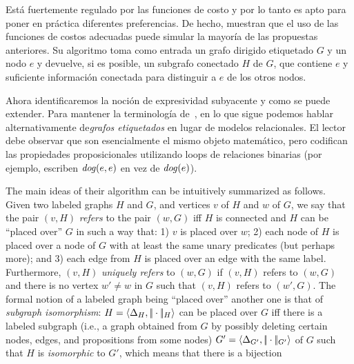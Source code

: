 Est\'a fuertemente regulado por las funciones de costo y por lo tanto es apto para poner en pr\'actica
diferentes preferencias. De hecho, muestran que el uso de las funciones de costos adecuadas
puede simular la mayor\'ia de las propuestas anteriores. Su algoritmo toma como entrada
un grafo dirigido etiquetado $G$ y un nodo $e$ y devuelve, si es posible,
un subgrafo conectado $H$  de $G$, que contiene $e$ y suficiente informaci\'on conectada para
distinguir a $e$ de los otros nodos.

Ahora identificaremos la noci\'on de expresividad subyacente y como se puede extender.
Para mantener la terminolog\'ia de~\cite{Krahmer2003}, en lo que sigue
podemos hablar alternativamente de\emph{grafos etiquetados} en lugar de modelos relacionales.
El lector debe observar que son esencialmente el mismo objeto matemático, pero codifican las propiedades proposicionales utilizando
loops de relaciones binarias (por ejemplo, escriben $\mathit{dog}(e,e)$ en vez de $\mathit{dog}(e)$).

The main ideas of their algorithm can be
intuitively summarized as follows.
Given two labeled graphs $H$ and $G$, and vertices $v$ of $H$
and $w$ of $G$, we say that the pair $(v,H)$ {\em refers}
to the pair $(w,G)$ iff $H$ is connected and $H$ can be ``placed
over'' $G$ in such a way that: 1) $v$ is placed over $w$; 2) each
node of $H$ is placed over a node of $G$ with at least the same
unary predicates (but perhaps more); and 3) each edge from $H$ is
placed over an edge with the same label. Furthermore, $(v,H)$ {\em
uniquely refers} to $(w,G)$ if $(v,H)$ refers to $(w,G)$ and there
is no vertex $w'\not=w$ in $G$ such that $(v,H)$ refers to $(w',G)$.
The formal notion of a labeled graph being ``placed over'' another
one is that of {\em subgraph isomorphism}:
$H=\langle \Delta_H,|\!|\cdot|\!|_H \rangle$ can be placed over
$G$ iff there is a labeled subgraph (i.e., a graph obtained from
$G$ by possibly deleting certain nodes, edges, and propositions from some nodes)
$G'=\langle \Delta_{G'},|\!|\cdot|\!|_{G'} \rangle$ of $G$ such that $H$ is {\em
isomorphic} to $G'$, which means that there is a
bijection


